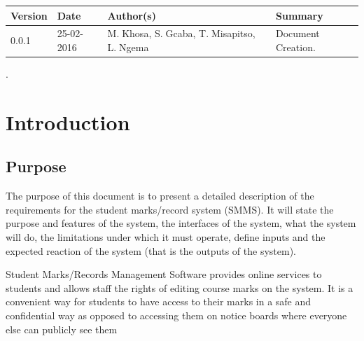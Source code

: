 \documentclass[10pt,onecolumn]{lab}
\begin{document}
\begin{center}
    \begin{tabular}{ | p{2cm} | p{3cm} | p{5cm} | p{5cm} |}
    \hline
    \textbf{Version}& \textbf{Date}& \textbf{Author(s)} & \textbf{Summary} \\ \hline
    0.0.1 & 25-02-2016 & M.$\;$Khosa, S.$\;$Gcaba, T.$\;$Misapitso, L.$\;$Ngema& Document Creation. \\ \hline

    \end{tabular}
\end{center}

\newpage


%
\pagestyle{plain}.
\section{Introduction}
\subsection{Purpose}

The purpose of this document is to present a detailed description of the requirements for the student marks/record system (SMMS). It will state the purpose and features of the system, the interfaces of the system, what the system will do, the limitations under which it must operate, define inputs and the expected reaction of the system (that is the outputs of the system). 

Student Marks/Records Management Software provides online services to students and allows staff the rights of editing course marks on the system. It is a convenient way for students to have access to their marks in a safe and confidential way as opposed to accessing them on notice boards where everyone else can publicly see them
\end{document}
